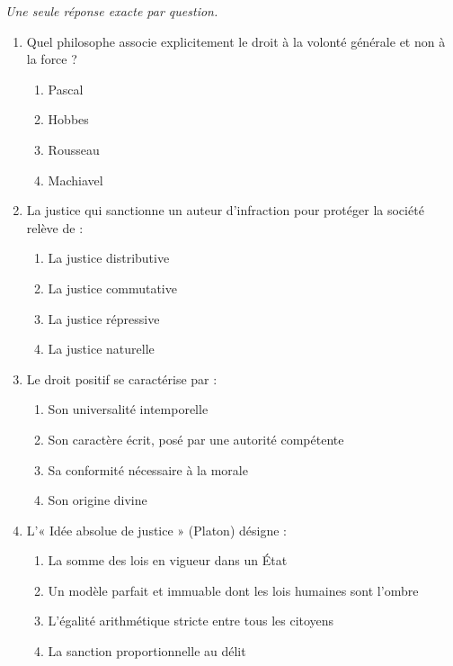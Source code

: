 \documentclass[11pt]{article}
\begin{document}
\begin{exercice}
\emph{Une seule réponse exacte par question.}
\begin{enumerate}
    \item Quel philosophe associe explicitement le droit à la volonté générale et non à la force ?
    \begin{enumerate}
        \item Pascal \item Hobbes \item Rousseau \item Machiavel
    \end{enumerate}
    \item La justice qui sanctionne un auteur d'infraction pour protéger la société relève de :
    \begin{enumerate}
        \item La justice distributive \item La justice commutative \item La justice répressive \item La justice naturelle
    \end{enumerate}
    \item Le droit positif se caractérise par :
    \begin{enumerate}
        \item Son universalité intemporelle \item Son caractère écrit, posé par une autorité compétente \item Sa conformité nécessaire à la morale \item Son origine divine
    \end{enumerate}
    \item L'« Idée absolue de justice » (Platon) désigne :
    \begin{enumerate}
        \item La somme des lois en vigueur dans un État \item Un modèle parfait et immuable dont les lois humaines sont l'ombre \item L'égalité arithmétique stricte entre tous les citoyens \item La sanction proportionnelle au délit
    \end{enumerate}
\end{enumerate}
\end{exercice}
\end{document}
